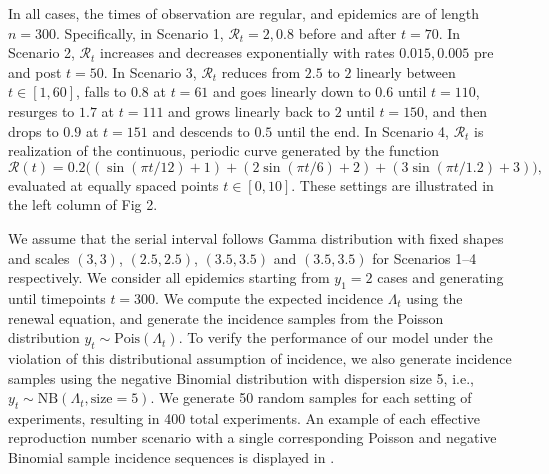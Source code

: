 \documentclass[10pt,letterpaper]{article}
\newcommand{\lr}[1]{\left(#1\right)}
\def\calR{\mathcal{R}}
\begin{document}
In all cases, the times of observation are regular, and epidemics are of
length $n=300$. Specifically, in Scenario 1, $\calR_t = 2, 0.8$ before and after
$t=70$. In Scenario 2, $\calR_t$ increases and decreases exponentially with
rates $0.015, 0.005$ pre and post $t=50$. In Scenario 3, $\calR_t$ reduces from
$2.5$ to $2$ linearly between $t\in[1,60]$, falls to $0.8$ at $t=61$ and goes
linearly down to $0.6$ until $t=110$, resurges to $1.7$ at $t=111$ and grows
linearly back to $2$ until $t=150$, and then drops to $0.9$ at $t=151$ and
descends to $0.5$ until the end. In Scenario 4, $\calR_t$ is realization of the
continuous, periodic curve generated by the function $$\calR(t) = 0.2 \big(
\lr{\sin(\pi t/12) + 1} + \lr{2 \sin\lr{\pi t / 6} + 2} + \lr{3
\sin(\pi t / 1.2) + 3}\big),$$ evaluated at equally spaced points $t\in [0,10]$. 
These settings are illustrated in the left column of Fig 2.


We assume that the serial interval follows Gamma distribution with fixed shapes
and scales $(3,3)$, $(2.5,2.5)$, $(3.5,3.5)$ and $(3.5,3.5)$ for Scenarios 1--4
respectively. We consider all epidemics starting from $y_1=2$ cases and
generating until timepoints $t=300$. We compute the expected incidence
$\Lambda_t$ using the renewal equation, and generate the incidence samples from
the Poisson distribution $y_t\sim \textrm{Pois}(\Lambda_t)$. To verify the
performance of our model under the violation of this distributional assumption
of incidence, we also generate incidence samples using the negative Binomial
distribution with dispersion size 5, i.e., $y_t\sim \textrm{NB}(\Lambda_t,
\textrm{size}=5)$. We generate 50 random samples for each setting of
experiments, resulting in 400 total experiments. An example of each effective
reproduction number scenario with a single corresponding Poisson and negative
Binomial sample incidence sequences is displayed in . 
\end{document}
